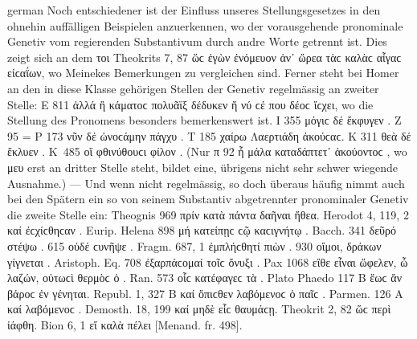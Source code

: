 \begin{otherlanguage*}{german}
Noch entschiedener ist der Einfluss unseres Stellungsgesetzes in den ohnehin auffälligen Beispielen anzuerkennen, wo der vorausgehende pronominale Genetiv vom regierenden Substantivum durch andre Worte getrennt ist. Dies zeigt sich an dem τοι Theokrits 7, 87 ὥϲ  ἐγὼν ἐνόμευον ἀν᾽ ὤρεα τὰϲ καλὰϲ αἶγαϲ  εἰϲαΐων, wo Meinekes Bemerkungen zu vergleichen sind. Ferner steht bei Homer an den in diese Klasse gehörigen Stellen der Genetiv regelmässig an zweiter Stelle: Ε 811 ἀλλά  ἢ κάματοϲ πολυᾶϊξ  δέδυκεν ἤ νύ ϲέ που δέοϲ ἴϲχει, wo die Stellung des Pronomens besonders bemerkenswert ist. Ι 355 μόγιϲ δέ  ἔκφυγεν . Ζ 95 = Ρ 173 νῦν δέ  ὠνοϲάμην πάγχυ . Τ 185 χαίρω  Λαερτιάδη  ἀκούϲαϲ. Κ 311 θεὰ δέ  ἔκλυεν . Κ~485 οἵ  φθινύθουϲι φίλον . (Nur π 92 ἦ μάλα  καταδάπτετ᾽ ἀκούοντοϲ , wo μευ erst an dritter Stelle steht, bildet eine, übrigens nicht sehr schwer wiegende Ausnahme.) — Und wenn nicht regelmässig, so doch überaus häufig nimmt auch bei den Spätern ein so von seinem Substantiv abgetrennter pronominaler Genetiv die zweite Stelle ein: Theognis 969 πρίν  κατὰ πάντα δαῆναι ἤθεα. Herodot 4, 119, 2 καί  ἐϲχίϲθηϲαν . Eurip. Helena 898 μή  κατείπῃϲ ϲῷ καϲιγνήτῳ . Bacch. 341 δεῦρό  στέψω . 615 οὐδέ  ϲυνῆψε . Fragm. 687, 1 ἐμπλήϲθητί  πιὼν . 930 οἴμοι, δράκων  γίγνεται . Aristoph. Eq. 708 ἐξαρπάϲομαί  τοῖϲ ὄνυξι . Pax 1068 εἴθε  εἶναι ὤφελεν, ὦ λαζών, οὑτωϲὶ θερμὸϲ ὁ . Ran. 573 οἷϲ  κατέφαγεϲ τὰ . Plato Phaedo 117 Β ἕωϲ ἄν  βάροϲ ἐν  γένηται. Republ. 1, 327 B καί  ὄπιϲθεν λαβόμενοϲ ὁ παῖϲ . Parmen. 126 Α καί  λαβόμενοϲ . Demosth. 18, 199 καί  μηδὲ εἷϲ  θαυμάϲῃ. Theokrit 2, 82 ὥϲ  περὶ  ἰάφθη. Bion 6, 1 εἴ  καλὰ πέλει  [Menand. fr. 498].


\end{otherlanguage*}
